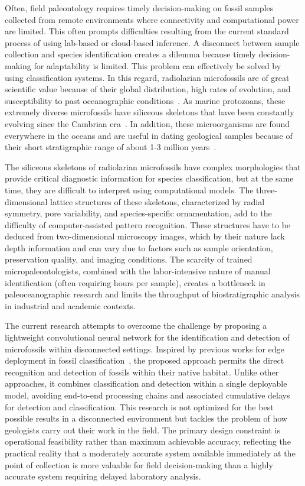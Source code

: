 \documentclass[a4paper,fleqn]{cas-sc}
\begin{document}
Often, field paleontology requires timely decision-making on fossil samples collected from remote environments where connectivity and computational power are limited. This often prompts difficulties resulting from the current standard process of using lab-based or cloud-based inference. A disconnect between sample collection and species identification creates a dilemma because timely decision-making for adaptability is limited. This problem can effectively be solved by using classification systems. In this regard, radiolarian microfossils are of great scientific value because of their global distribution, high rates of evolution, and susceptibility to past oceanographic conditions~\cite{brombacher2020radiolarian}. As marine protozoans, these extremely diverse microfossils have siliceous skeletons that have been constantly evolving since the Cambrian era~\cite{brombacher2020radiolarian}. In addition, these microorganisms are found everywhere in the oceans and are useful in dating geological samples because of their short stratigraphic range of about 1-3 million years~\cite{brombacher2020radiolarian}.

The siliceous skeletons of radiolarian microfossils have complex morphologies that provide critical diagnostic information for species classification, but at the same time, they are difficult to interpret using computational models. The three-dimensional lattice structures of these skeletons, characterized by radial symmetry, pore variability, and species-specific ornamentation, add to the difficulty of computer-assisted pattern recognition. These structures have to be deduced from two-dimensional microscopy images, which by their nature lack depth information and can vary due to factors such as sample orientation, preservation quality, and imaging conditions. The scarcity of trained micropaleontologists, combined with the labor-intensive nature of manual identification (often requiring hours per sample), creates a bottleneck in paleoceanographic research and limits the throughput of biostratigraphic analysis in industrial and academic contexts.

The current research attempts to overcome the challenge by proposing a lightweight convolutional neural network for the identification and detection of microfossils within disconnected settings. Inspired by previous works for edge deployment in fossil classification~\cite{lin2022edge}, the proposed approach permits the direct recognition and detection of fossils within their native habitat. Unlike other approaches, it combines classification and detection within a single deployable model, avoiding end-to-end processing chains and associated cumulative delays for detection and classification. This research is not optimized for the best possible results in a disconnected environment but tackles the problem of how geologists carry out their work in the field. The primary design constraint is operational feasibility rather than maximum achievable accuracy, reflecting the practical reality that a moderately accurate system available immediately at the point of collection is more valuable for field decision-making than a highly accurate system requiring delayed laboratory analysis.
\end{document}
